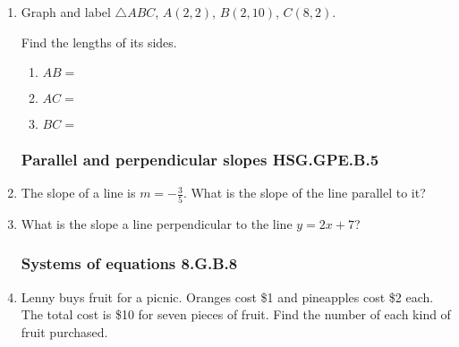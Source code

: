 \begin{enumerate}
\item Graph and label $\triangle ABC$, $A(2,2)$, $B(2,10)$, $C(8,2)$.
\begin{multicols}{2}
  \begin{flushleft}
  \end{flushleft}
    Find the lengths of its sides.
    \begin{enumerate}[itemsep=0.5cm]
      \item $AB=$
      \item $AC=$
      \item $BC=$
    \end{enumerate}
  \end{multicols}

\subsubsection*{Parallel and perpendicular slopes \hfill HSG.GPE.B.5}
\item The slope of a line is $m= -\frac{3}{5}$. What is the slope of the line parallel to it? \vspace{2cm}
\item What is the slope a line perpendicular to the line $y=2x+7$?

\newpage
\subsubsection*{Systems of equations \hfill 8.G.B.8}
\item Lenny buys fruit for a picnic. Oranges cost \$1 and pineapples cost \$2 each. The total cost is \$10 for seven pieces of fruit. Find the number of each kind of fruit purchased.
  \begin{flushright}
  \end{flushright}


\end{enumerate}
